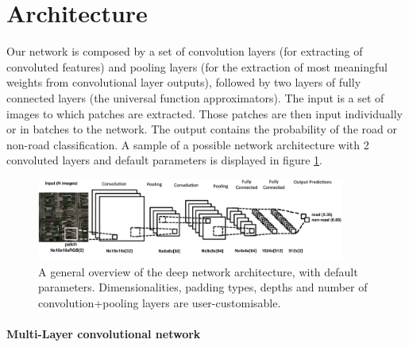 \documentclass[fleqn,9 pt]{SelfArx} %
\begin{document}
\begin{sloppypar}
\section{Architecture}

Our network is composed by a set of convolution layers (for extracting of convoluted features) and pooling layers (for the extraction of most meaningful weights from convolutional layer outputs), followed by two layers of fully connected layers (the universal function approximators). The input is a set of images to which patches are extracted. Those patches are then input individually or in batches to the network. The output contains the probability of the road or non-road classification. A sample of a possible network architecture with 2 convoluted layers and default parameters is displayed in figure \ref{fig-conv-2d-architecture}.

\begin{figure}
\centering
\includegraphics[width=0.9\textwidth]{figures/conv_2d_network.png}
\caption{\small A general overview of the deep network architecture, with default parameters. Dimensionalities, padding types, depths and number of convolution+pooling layers are user-customisable.}
\label{fig-conv-2d-architecture}
\end{figure}


\paragraph{Multi-Layer convolutional network}


\end{sloppypar}
\end{document}
